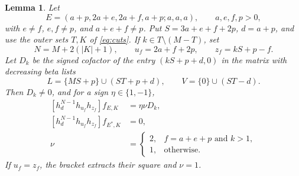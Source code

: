 \documentclass[11pt,a4paper]{amsart}
\numberwithin{equation}{section}
\theoremstyle{plain}
\newtheorem{lemma}[theorem]{Lemma}
\theoremstyle{definition}
\begin{document}
\begin{lemma}\label{lem:four-row-return}
Let
\[
 E=(a+p,2a+e,2a+f,a+p;a,a,a),\qquad a,e,f,p>0,
\]
with \(e\ne f\), \(e,f\ne p\), and \(a+e+f\ne p\).  Put \(S=3a+e+f+2p\), \(d=a+p\), and use the outer sets \(T,K\) of \eqref{eq:cuts}.  If \(k\in T\setminus(M-T)\), set
\[
 N=M+2(|K|+1),\qquad u_f=2a+f+2p,\qquad z_f=kS+p-f.
\]
Let \(D_k\) be the signed cofactor of the entry \((kS+p+d,0)\) in the matrix with decreasing beta lists
\begin{equation}\label{eq:four-row-return-lists}
 L=\{MS+p\}\cup(ST+p+d),\qquad V=\{0\}\cup(ST-d).
\end{equation}
Then \(D_k\ne0\), and for a sign \(\eta\in\{1,-1\}\),
\begin{equation}\label{eq:four-row-return}
 \begin{aligned}
 [h_d^{N-1}h_{u_f}h_{z_f}]f_{E,K}&=\eta\nu D_k,\\
 [h_d^{N-1}h_{u_f}h_{z_f}]f_{E^*,K}&=0,\\
 \nu&=\begin{cases}2,&f=a+e+p\text{ and }k>1,\\1,&\text{otherwise}.\end{cases}
 \end{aligned}
\end{equation}
If \(u_f=z_f\), the bracket extracts their square and \(\nu=1\).
\end{lemma}
\end{document}
